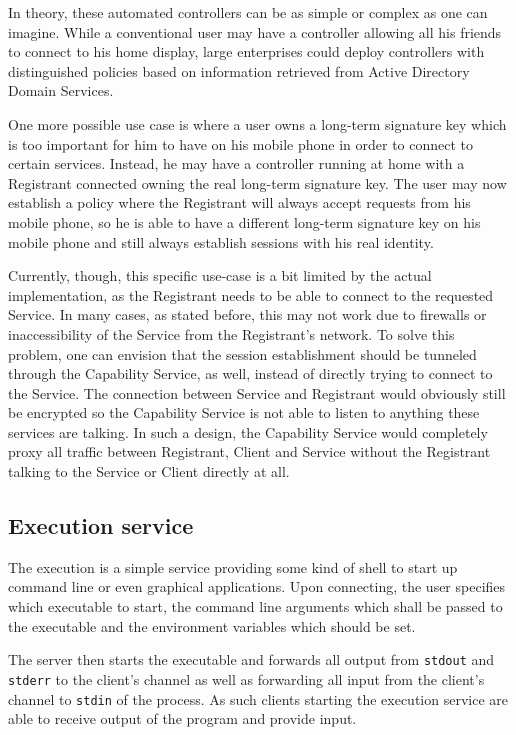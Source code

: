 In theory, these automated controllers can be as simple or complex as one can imagine.
While a conventional user may have a controller allowing all his friends to connect to his home display, large enterprises could deploy controllers with distinguished policies based on information retrieved from Active Directory Domain Services.

One more possible use case is where a user owns a long-term signature key which is too important for him to have on his mobile phone in order to connect to certain services.
Instead, he may have a controller running at home with a Registrant connected owning the real long-term signature key.
The user may now establish a policy where the Registrant will always accept requests from his mobile phone, so he is able to have a different long-term signature key on his mobile phone and still always establish sessions with his real identity.

Currently, though, this specific use-case is a bit limited by the actual implementation, as the Registrant needs to be able to connect to the requested Service.
In many cases, as stated before, this may not work due to firewalls or inaccessibility of the Service from the Registrant's network.
To solve this problem, one can envision that the session establishment should be tunneled through the Capability Service, as well, instead of directly trying to connect to the Service.
The connection between Service and Registrant would obviously still be encrypted so the Capability Service is not able to listen to anything these services are talking.
In such a design, the Capability Service would completely proxy all traffic between Registrant, Client and Service without the Registrant talking to the Service or Client directly at all.

\subsection{Execution service}
\label{sec:exec-service}

The execution is a simple service providing some kind of shell to start up command line or even graphical applications.
Upon connecting, the user specifies which executable to start, the command line arguments which shall be passed to the executable and the environment variables which should be set.

The server then starts the executable and forwards all output from \lstinline{stdout} and \lstinline{stderr} to the client's channel as well as forwarding all input from the client's channel to \lstinline{stdin} of the process.
As such clients starting the execution service are able to receive output of the program and provide input.

